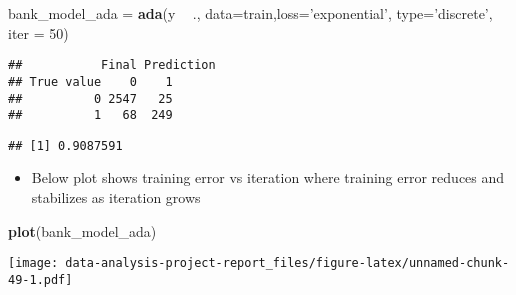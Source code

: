 \documentclass[
]{article}
\newenvironment{Shaded}{\begin{snugshade}}{\end{snugshade}}
\newcommand{\DataTypeTok}[1]{\textcolor[rgb]{0.13,0.29,0.53}{#1}}
\newcommand{\DecValTok}[1]{\textcolor[rgb]{0.00,0.00,0.81}{#1}}
\newcommand{\KeywordTok}[1]{\textcolor[rgb]{0.13,0.29,0.53}{\textbf{#1}}}
\newcommand{\NormalTok}[1]{#1}
\newcommand{\OperatorTok}[1]{\textcolor[rgb]{0.81,0.36,0.00}{\textbf{#1}}}
\newcommand{\StringTok}[1]{\textcolor[rgb]{0.31,0.60,0.02}{#1}}
\providecommand{\tightlist}{%
  \setlength{\itemsep}{0pt}\setlength{\parskip}{0pt}}
\begin{document}
\begin{Shaded}
\begin{Highlighting}[]
\NormalTok{bank_model_ada =}\StringTok{ }\KeywordTok{ada}\NormalTok{(y }\OperatorTok{~}\StringTok{ }\NormalTok{., }\DataTypeTok{data=}\NormalTok{train,}\DataTypeTok{loss=}\StringTok{'exponential'}\NormalTok{, }\DataTypeTok{type=}\StringTok{'discrete'}\NormalTok{, }\DataTypeTok{iter =} \DecValTok{50}\NormalTok{)}
\end{Highlighting}
\end{Shaded}

\begin{Shaded}
\end{Shaded}

\begin{verbatim}
##           Final Prediction
## True value    0    1
##          0 2547   25
##          1   68  249
\end{verbatim}

\begin{Shaded}
\end{Shaded}

\begin{verbatim}
## [1] 0.9087591
\end{verbatim}

\begin{itemize}
\tightlist
\item
  Below plot shows training error vs iteration where training error
  reduces and stabilizes as iteration grows
\end{itemize}

\begin{Shaded}
\begin{Highlighting}[]
\KeywordTok{plot}\NormalTok{(bank_model_ada)}
\end{Highlighting}
\end{Shaded}

\texttt{[image: data-analysis-project-report\_files/figure-latex/unnamed-chunk-49-1.pdf]}
\end{document}
